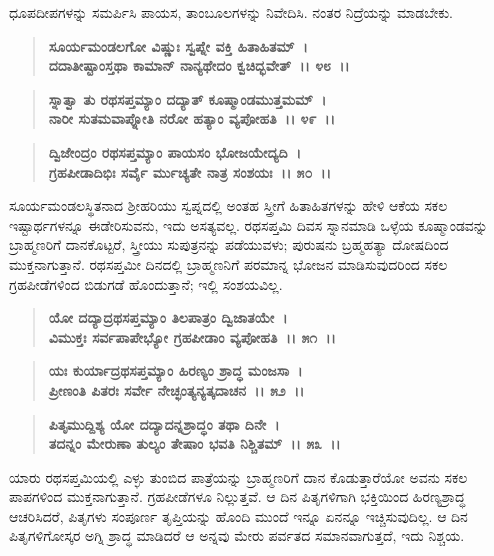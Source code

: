 ಧೂಪದೀಪಗಳನ್ನು ಸಮರ್ಪಿಸಿ ಪಾಯಸ, ತಾಂಬೂಲಗಳನ್ನು ನಿವೇದಿಸಿ. ನಂತರ ನಿದ್ರೆಯನ್ನು ಮಾಡಬೇಕು.

\begin{verse}
\textbf{ಸೂರ್ಯಮಂಡಲಗೋ ವಿಷ್ಣುಃ ಸ್ವಪ್ನೇ ವಕ್ತಿ ಹಿತಾಹಿತಮ್‌~।}\\\textbf{ದದಾತೀಷ್ಟಾಂಸ್ತಥಾ ಕಾಮಾನ್ ನಾನ್ಯಥೇದಂ ಕ್ವಚಿದ್ಭವೇತ್~।। ೪೮~।। }
\end{verse}

\begin{verse}
\textbf{ಸ್ನಾತ್ವಾ ತು ರಥಸಪ್ತಮ್ಯಾಂ ದದ್ಯಾತ್ ಕೂಷ್ಮಾಂಡಮುತ್ತಮಮ್~।}\\\textbf{ನಾರೀ ಸುತಮವಾಪ್ನೋತಿ ನರೋ ಹತ್ಯಾಂ ವ್ಯಪೋಹತಿ~।। ೪೯~।। }
\end{verse}

\begin{verse}
\textbf{ದ್ವಿಜೇಂದ್ರಂ ರಥಸಪ್ತಮ್ಯಾಂ ಪಾಯಸಂ ಭೋಜಯೇದ್ಯದಿ~।}\\\textbf{ಗ್ರಹಪೀಡಾದಿಭಿಃ ಸರ್ವೈ ರ್ಮುಚ್ಯತೇ ನಾತ್ರ ಸಂಶಯಃ~।। ೫೦~।।}
\end{verse}

ಸೂರ್ಯಮಂಡಲಸ್ಥಿತನಾದ ಶ‍್ರೀಹರಿಯು ಸ್ವಪ್ನದಲ್ಲಿ ಅಂತಹ ಸ್ತ್ರೀಗೆ ಹಿತಾಹಿತಗಳನ್ನು ಹೇಳಿ ಆಕೆಯ ಸಕಲ ಇಷ್ಟಾರ್ಥಗಳನ್ನೂ ಈಡೇರಿಸುವನು, ಇದು ಅಸತ್ಯವಲ್ಲ. ರಥಸಪ್ತಮಿ ದಿವಸ ಸ್ನಾನಮಾಡಿ ಒಳ್ಳೆಯ ಕೂಷ್ಮಾಂಡವನ್ನು ಬ್ರಾಹ್ಮಣರಿಗೆ ದಾನಕೊಟ್ಟರೆ, ಸ್ತ್ರೀಯು ಸುಪುತ್ರನನ್ನು ಪಡೆಯುವಳು; ಪುರುಷನು ಬ್ರಹ್ಮಹತ್ಯಾ ದೋಷದಿಂದ ಮುಕ್ತನಾಗುತ್ತಾನೆ. ರಥಸಪ್ತಮೀ ದಿನದಲ್ಲಿ ಬ್ರಾಹ್ಮಣನಿಗೆ ಪರಮಾನ್ನ ಭೋಜನ ಮಾಡಿಸುವುದರಿಂದ ಸಕಲ ಗ್ರಹಪೀಡೆಗಳಿಂದ ಬಿಡುಗಡೆ ಹೊಂದುತ್ತಾನೆ; ಇಲ್ಲಿ ಸಂಶಯವಿಲ್ಲ.

\begin{verse}
\textbf{ಯೋ ದದ್ಯಾದ್ರಥಸಪ್ತಮ್ಯಾಂ ತಿಲಪಾತ್ರಂ ದ್ವಿಜಾತಯೇ~।}\\\textbf{ವಿಮುಕ್ತಃ ಸರ್ವಪಾಪೇಭ್ಯೋ ಗ್ರಹಪೀಡಾಂ ವ್ಯಪೋಹತಿ~।। ೫೧~।।}
\end{verse}

\begin{verse}
\textbf{ಯಃ ಕುರ್ಯಾದ್ರಥಸಪ್ತಮ್ಯಾಂ ಹಿರಣ್ಯಂ ಶ್ರಾದ್ಧ ಮಂಜಸಾ~।}\\\textbf{ಪ್ರೀಣಂತಿ ಪಿತರಃ ಸರ್ವೇ ನೇಚ್ಛಂತ್ಯನ್ಯತ್ಕದಾಚನ~।। ೫೨~।।} 
\end{verse}

\begin{verse}
\textbf{ಪಿತೃಮುದ್ದಿಶ್ಯ ಯೋ ದದ್ಯಾದನ್ನಶ್ರಾದ್ಧಂ ತಥಾ ದಿನೇ~।}\\\textbf{ತದನ್ನಂ ಮೇರುಣಾ ತುಲ್ಯಂ ತೇಷಾಂ ಭವತಿ ನಿಶ್ಚಿತಮ್~।। ೫೩~।।}
\end{verse}

ಯಾರು ರಥಸಪ್ತಮಿಯಲ್ಲಿ ಎಳ್ಳು ತುಂಬಿದ ಪಾತ್ರೆಯನ್ನು ಬ್ರಾಹ್ಮಣರಿಗೆ ದಾನ ಕೊಡುತ್ತಾ\-ರೆಯೋ ಅವನು ಸಕಲ ಪಾಪಗಳಿಂದ ಮುಕ್ತನಾಗುತ್ತಾನೆ. ಗ್ರಹಪೀಡೆಗಳೂ ನಿಲ್ಲುತ್ತವೆ. ಆ ದಿನ ಪಿತೃಗಳಿಗಾಗಿ ಭಕ್ತಿಯಿಂದ ಹಿರಣ್ಯಶ್ರಾದ್ಧ ಆಚರಿಸಿದರೆ, ಪಿತೃಗಳು ಸಂಪೂರ್ಣ ತೃಪ್ತಿಯನ್ನು ಹೊಂದಿ ಮುಂದೆ ಇನ್ನೂ ಏನನ್ನೂ ಇಚ್ಚಿಸುವುದಿಲ್ಲ. ಆ ದಿನ ಪಿತೃಗಳಿಗೋಸ್ಕರ ಅಗ್ನಿ ಶ್ರಾದ್ಧ ಮಾಡಿದರೆ ಆ ಅನ್ನವು ಮೇರು ಪರ್ವತದ ಸಮಾನವಾಗುತ್ತದೆ, ಇದು ನಿಶ್ಚಯ.

